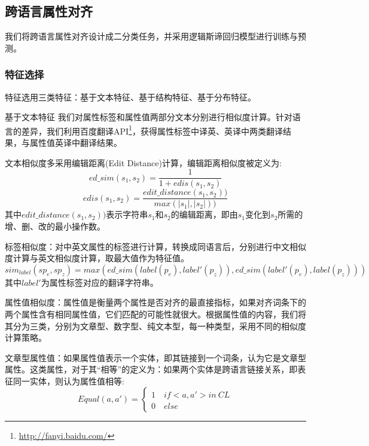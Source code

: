 \subsection{跨语言属性对齐}
\label{sec:cross-lingual-property-matching}
我们将跨语言属性对齐设计成二分类任务，并采用逻辑斯谛回归模型进行训练与预测。

\subsubsection{特征选择}
特征选用三类特征：基于文本特征、基于结构特征、基于分布特征。

{\heiti 基于文本特征} 我们对属性标签和属性值两部分文本分别进行相似度计算。针对语言的差异，我们利用百度翻译API\footnote{\url{http://fanyi.baidu.com/}}，获得属性标签中译英、英译中两类翻译结果，与属性值英译中翻译结果。

文本相似度多采用编辑距离(Edit Distance)计算，编辑距离相似度被定义为:
\begin{equation}
ed\_sim(s_1, s_2) = \frac{1}{1+edis(s_1,s_2)}
\end{equation}
\begin{equation}
edis(s_1,s_2)=\frac{edit\_distance(s_1, s_2))}{max(\left| s_1 \right |,\left | s_2 \right |))}
\end{equation}
其中$edit\_distance(s_1, s_2))$表示字符串$s_1$和$s_2$的编辑距离，即由$s_1$变化到$s_2$所需的增、删、改的最小操作数。

标签相似度：对中英文属性的标签进行计算，转换成同语言后，分别进行中文相似度计算与英文相似度计算，取最大值作为特征值。
\begin{equation}
\label{}
sim_{label}(sp_e, sp_z) = max(ed\_sim(label(p_e), label'(p_z)), ed\_sim(label'(p_e), label(p_z)))
\end{equation}
其中$label'$为属性标签对应的翻译字符串。

属性值相似度：属性值是衡量两个属性是否对齐的最直接指标，如果对齐词条下的两个属性含有相同属性值，它们匹配的可能性就很大。根据属性值的内容，我们将其分为三类，分别为文章型、数字型、纯文本型，每一种类型，采用不同的相似度计算策略。

文章型属性值：如果属性值表示一个实体，即其链接到一个词条，认为它是文章型属性。这类属性，对于其“相等”的定义为：如果两个实体是跨语言链接关系，即表征同一实体，则认为属性值相等:
\begin{equation}
Equal(a,a')=\left\{\begin{matrix}
1 \quad  if <a,a'> in \ CL\\
0 \quad  else
\end{matrix}\right.
\end{equation}

